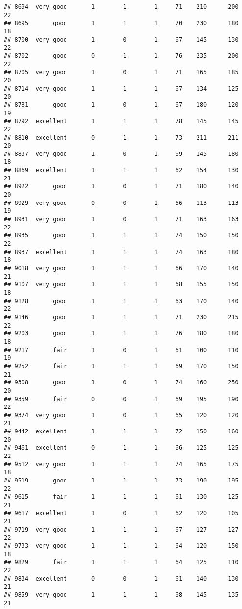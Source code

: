\documentclass[]{article}
\begin{document}
\begin{verbatim}
## 8694  very good       1        1        1     71    210      200  22
## 8695       good       1        1        1     70    230      180  18
## 8700  very good       1        0        1     67    145      130  22
## 8702       good       0        1        1     76    235      200  22
## 8705  very good       1        0        1     71    165      185  20
## 8714  very good       1        1        1     67    134      125  20
## 8781       good       1        0        1     67    180      120  19
## 8792  excellent       1        1        1     78    145      145  22
## 8810  excellent       0        1        1     73    211      211  20
## 8837  very good       1        0        1     69    145      180  18
## 8869  excellent       1        1        1     62    154      130  21
## 8922       good       1        0        1     71    180      140  20
## 8929  very good       0        0        1     66    113      113  19
## 8931  very good       1        0        1     71    163      163  22
## 8935       good       1        1        1     74    150      150  22
## 8937  excellent       1        1        1     74    163      180  18
## 9018  very good       1        1        1     66    170      140  21
## 9107  very good       1        1        1     68    155      150  18
## 9128       good       1        1        1     63    170      140  22
## 9146       good       1        1        1     71    230      215  22
## 9203       good       1        1        1     76    180      180  18
## 9217       fair       1        0        1     61    100      110  19
## 9252       fair       1        1        1     69    170      150  21
## 9308       good       1        0        1     74    160      250  20
## 9359       fair       0        0        1     69    195      190  22
## 9374  very good       1        0        1     65    120      120  21
## 9442  excellent       1        1        1     72    150      160  20
## 9461  excellent       0        1        1     66    125      125  22
## 9512  very good       1        1        1     74    165      175  18
## 9519       good       1        1        1     73    190      195  22
## 9615       fair       1        1        1     61    130      125  21
## 9617  excellent       1        0        1     62    120      105  21
## 9719  very good       1        1        1     67    127      127  22
## 9733  very good       1        1        1     64    120      150  18
## 9829       fair       1        1        1     64    125      110  22
## 9834  excellent       0        0        1     61    140      130  21
## 9859  very good       1        1        1     68    145      135  21

\end{verbatim}
\end{document}
